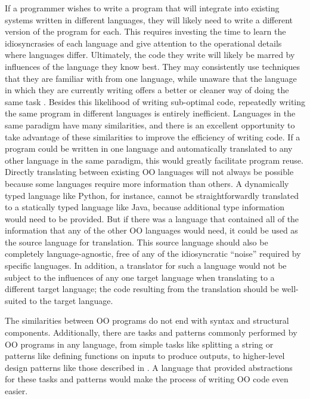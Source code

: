 \documentclass[sigplan,review,anonymous]{acmart}\settopmatter{printfolios=true,printccs=false,printacmref=false}
\begin{document}
If a programmer wishes to write a program that will integrate into 
existing systems written in different languages, they will likely need to 
write a different version of the program for each. This 
requires investing the time to learn the idiosyncrasies of each language and 
give attention to the operational details where languages differ. Ultimately, 
the code they write will likely be marred by influences of the language they 
know best. They may consistently use techniques that they are familiar with 
from one language, while unaware that the language in which they are currently 
writing offers a better or cleaner way of doing the same task 
\cite{scholtz1990learning, alexandron2012effect}. Besides this 
likelihood of writing sub-optimal code, repeatedly writing the same program in 
different languages is entirely inefficient. 
Languages in the same paradigm have many similarities, and there is an 
excellent opportunity to take advantage of these similarities to improve the
efficiency of writing code. If a program could be written in one language and
automatically translated to any other language in the same paradigm, this would
greatly facilitate program reuse. Directly translating between existing 
OO languages will not always be possible because some languages 
require more information than others. A dynamically typed language like Python, 
for instance, cannot be straightforwardly translated to a statically typed 
language like Java, because additional type information would need to be 
provided. But if there was a language that contained all of the information 
that any of the other OO languages would need, it could be used as the source 
language for translation. This source language should also be completely 
language-agnostic, free of any of the idiosyncratic ``noise'' required by
specific languages. In addition, a translator for such a language would not be 
subject to the influences of any one target language when translating to a 
different target language; the code resulting from the translation should be 
well-suited to the target language.

The similarities between OO programs do not end with syntax and structural 
components. Additionally, there are tasks and patterns commonly performed by OO
programs in any language, from simple tasks like splitting a string or 
patterns like defining functions on inputs to produce outputs, to higher-level 
design patterns like those described in \cite{gamma1995design}. A language 
that provided abstractions for these tasks and patterns would make the process 
of writing OO code even easier.
\end{document}
